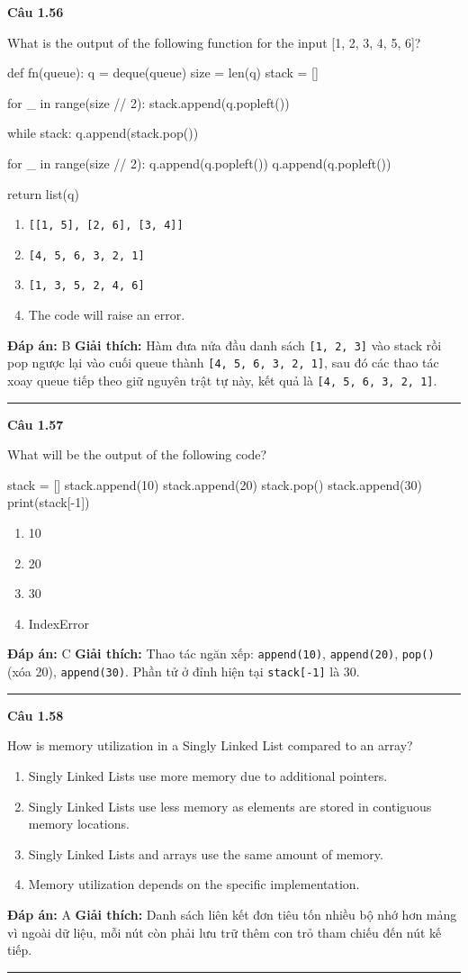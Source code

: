 \documentclass[11pt,a4paper]{article}
\newenvironment{question}[1]{%
  \par\vspace{1em}\noindent\textbf{\large Câu #1}\par\vspace{0.4em}
}{%
  \par\vspace{1em}\hrule\vspace{0.6em}
}
\newenvironment{choices}{%
  \begin{enumerate}[label=\textbf{\Alph*.},leftmargin=2.2em,itemsep=2pt,topsep=3pt]
}{%
  \end{enumerate}
}
\newcommand{\choice}{\item}
\newenvironment{codebox}{%
  \begin{tcolorbox}[colback=gray!8!white,colframe=gray!50!black,arc=1.5mm,boxrule=0.6pt,left=3mm,right=3mm,top=2.5mm,bottom=2.5mm]
  \ttfamily\small
}{%
  \end{tcolorbox}
}
\begin{document}
\begin{question}{1.56}
What is the output of the following function for the input [1, 2, 3, 4, 5, 6]?
\begin{codebox}
def fn(queue):
    q = deque(queue)
    size = len(q)
    stack = []

    for _ in range(size // 2):
        stack.append(q.popleft())

    while stack:
        q.append(stack.pop())

    for _ in range(size // 2):
        q.append(q.popleft())
        q.append(q.popleft())

    return list(q)
\end{codebox}
\begin{choices}
\choice \texttt{[[1, 5], [2, 6], [3, 4]]}
\choice \texttt{[4, 5, 6, 3, 2, 1]}
\choice \texttt{[1, 3, 5, 2, 4, 6]}
\choice The code will raise an error.
\end{choices}
\textbf{Đáp án:} B
\textbf{Giải thích:} Hàm đưa nửa đầu danh sách \texttt{[1, 2, 3]} vào stack rồi pop ngược lại vào cuối queue thành \texttt{[4, 5, 6, 3, 2, 1]}, sau đó các thao tác xoay queue tiếp theo giữ nguyên trật tự này, kết quả là \texttt{[4, 5, 6, 3, 2, 1]}.
\end{question}

\begin{question}{1.57}
What will be the output of the following code?
\begin{codebox}
stack = []
stack.append(10)
stack.append(20)
stack.pop()
stack.append(30)
print(stack[-1])
\end{codebox}
\begin{choices}
\choice 10
\choice 20
\choice 30
\choice IndexError
\end{choices}
\textbf{Đáp án:} C
\textbf{Giải thích:} Thao tác ngăn xếp: \texttt{append(10)}, \texttt{append(20)}, \texttt{pop()} (xóa 20), \texttt{append(30)}. Phần tử ở đỉnh hiện tại \texttt{stack[-1]} là 30.
\end{question}

\begin{question}{1.58}
How is memory utilization in a Singly Linked List compared to an array?
\begin{choices}
\choice Singly Linked Lists use more memory due to additional pointers.
\choice Singly Linked Lists use less memory as elements are stored in contiguous memory locations.
\choice Singly Linked Lists and arrays use the same amount of memory.
\choice Memory utilization depends on the specific implementation.
\end{choices}
\textbf{Đáp án:} A
\textbf{Giải thích:} Danh sách liên kết đơn tiêu tốn nhiều bộ nhớ hơn mảng vì ngoài dữ liệu, mỗi nút còn phải lưu trữ thêm con trỏ tham chiếu đến nút kế tiếp.
\end{question}
\end{document}
